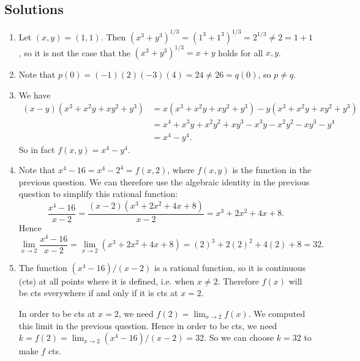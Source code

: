 \documentclass[12pt,a4paper]{article}
\newcommand{\rar}{\rightarrow}
\begin{document}
\subsection*{Solutions}
\begin{enumerate}
	\item Let $(x,y) = (1,1)$. Then $(x^3 + y^3)^{1/3} = (1^3 + 1^3)^{1/3} = 2^{1/3} \ne 2 = 1 + 1$, so it is not the case that the $(x^3 + y^3)^{1/3} = x + y$ holds for all $x,y$.
	\item Note that $p(0) = (-1)(2)(-3)(4) = 24 \ne 26 = q(0)$, so $p \ne q$.
	\item We have
\begin{equation*}
\begin{split}
	(x - y)(x^3 + x^2y + xy^2 + y^3) &= x(x^3 + x^2y + xy^2 + y^3) - y(x^3 + x^2y + xy^2 + y^3) \\
		&=x^4 + x^3y + x^2y^2 + xy^3 - x^3y - x^2y^2 - xy^3 - y^4 \\
		&=x^4 - y^4.
\end{split}
\end{equation*}
So in fact $f(x,y) = x^4 - y^4$.
	\item Note that $x^4 - 16 = x^4 - 2^4 = f(x,2)$, where $f(x,y)$ is the function in the previous question. We can therefore use the algebraic identity in the previous question to simplify this rational function:
\[
	\frac{x^4 - 16}{x - 2} = \frac{(x-2)(x^3 + 2x^2 + 4x + 8)}{x-2} = x^3 + 2x^2 + 4x + 8.
\]
Hence
\[
	\lim_{x \rar 2}\frac{x^4 - 16}{x-2} = \lim_{x \rar 2} (x^3 + 2x^2 + 4x + 8) = (2)^3 + 2(2)^2 + 4(2) + 8 = 32.
\]
	\item The function $(x^4 - 16)/(x-2)$ is a rational function, so it is continuous (cts) at all points where it is defined, i.e. when $x \ne 2$. Therefore $f(x)$ will be cts everywhere if and only if it is cts at $x = 2$.

In order to be cts at $x = 2$, we need $f(2) = \lim_{x \rar 2}f(x)$. We computed this limit in the previous question. Hence in order to be cts, we need $k = f(2) = \lim_{x \rar 2}(x^4 - 16)/(x-2) = 32$. So we can choose $k = 32$ to make $f$ cts.
\end{enumerate}
\end{document}
